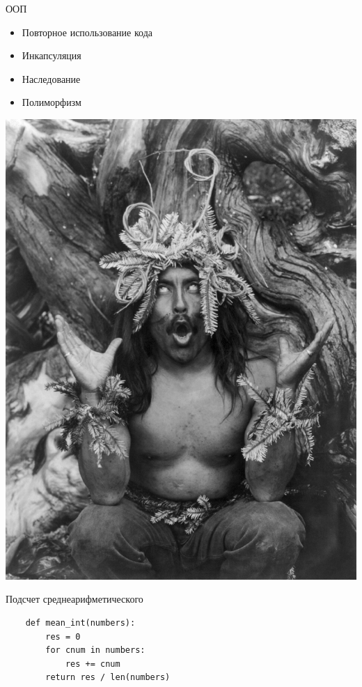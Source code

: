 \documentclass{article}
\begin{document}
\LARGE
\begin{center} ООП \end{center}
    \begin{itemize}
         \item Повторное использование кода
         \item Инкапсуляция
         \item Наследование
         \item Полиморфизм
     \end{itemize} 
\newpage
\begin{center} \includegraphics[scale=5]{images/Hamatsa_shaman2.jpg} \end{center}
\newpage

\begin{center} Подсчет среднеарифметического \end{center}
\begin{lstlisting}
    def mean_int(numbers):
        res = 0
        for cnum in numbers:
            res += cnum
        return res / len(numbers)
\end{lstlisting}
\newpage
\end{document}
